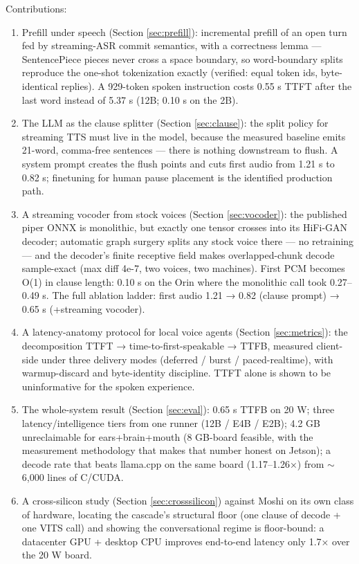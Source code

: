\documentclass{article}
\begin{document}
Contributions:

\begin{enumerate}
	\item Prefill under speech (Section \ref{sec:prefill}): incremental prefill of an open turn fed by streaming-ASR commit semantics, with a correctness lemma — SentencePiece pieces never cross a space boundary, so word-boundary splits reproduce the one-shot tokenization exactly (verified: equal token ids, byte-identical replies). A 929-token spoken instruction costs 0.55 s TTFT after the last word instead of 5.37 s (12B; 0.10 s on the 2B).
	\item The LLM as the clause splitter (Section \ref{sec:clause}): the split policy for streaming TTS must live in the model, because the measured baseline emits 21-word, comma-free sentences — there is nothing downstream to flush. A system prompt creates the flush points and cuts first audio from 1.21 s to 0.82 s; finetuning for human pause placement is the identified production path.
	\item A streaming vocoder from stock voices (Section \ref{sec:vocoder}): the published piper ONNX is monolithic, but exactly one tensor crosses into its HiFi-GAN decoder; automatic graph surgery splits any stock voice there — no retraining — and the decoder's finite receptive field makes overlapped-chunk decode sample-exact (max diff 4e-7, two voices, two machines). First PCM becomes O(1) in clause length: 0.10 s on the Orin where the monolithic call took 0.27–0.49 s. The full ablation ladder: first audio 1.21 → 0.82 (clause prompt) → 0.65 s (+streaming vocoder).
	\item A latency-anatomy protocol for local voice agents (Section \ref{sec:metrics}): the decomposition TTFT → time-to-first-speakable → TTFB, measured client-side under three delivery modes (deferred / burst / paced-realtime), with warmup-discard and byte-identity discipline. TTFT alone is shown to be uninformative for the spoken experience.
	\item The whole-system result (Section \ref{sec:eval}): 0.65 s TTFB on 20 W; three latency/intelligence tiers from one runner (12B / E4B / E2B); 4.2 GB unreclaimable for ears+brain+mouth (8 GB-board feasible, with the measurement methodology that makes that number honest on Jetson); a decode rate that beats llama.cpp on the same board (1.17–1.26×) from $\sim$6,000 lines of C/CUDA.
	\item A cross-silicon study (Section \ref{sec:crosssilicon}) against Moshi on its own class of hardware, locating the cascade's structural floor (one clause of decode + one VITS call) and showing the conversational regime is floor-bound: a datacenter GPU + desktop CPU improves end-to-end latency only 1.7× over the 20 W board.
\end{enumerate}
\end{document}
